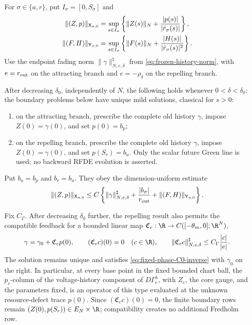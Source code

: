 \begin{proposition}
For \(\sigma\in\{a,r\}\), put \(I_\sigma=[0,S_\sigma]\) and
\begin{align}
 \|(Z,p)\|_{\mathsf X_{\sigma,0}}
 &=\sup_{s\in I_\sigma}
   \left\{\|Z(s)\|_N+\frac{|p(s)|}{|\bar r_\sigma(s)|}\right\},\notag\\
 \|(F,H)\|_{\mathsf Y_{\sigma,0}}
 &=\sup_{s\in I_\sigma}
   \left\{\|F(s)\|_N+\frac{|H(s)|}{|\bar r_\sigma(s)|^2}\right\}. \label{eq:fixed-phase-C0-spaces}
\end{align}
Use the endpoint fading norm
\(\|\gamma\|_{N,e,\delta}^{\sharp}\) from
\cref{eq:frozen-history-norm}, with \(e=r_{\rm out}\) on the attracting
branch and \(e=-\rho_\delta\) on the repelling branch.

After decreasing \(\delta_0\), independently of \(N\), the following holds
whenever \(0<\delta<\delta_0\): the boundary problems below have unique mild
solutions, classical for \(s>0\):
\begin{enumerate}[label=\textup{(\alph*)},leftmargin=2em]
\item on the attracting branch, prescribe the complete old history
\(\gamma\), impose \(Z(0)=\gamma(0)\), and set \(p(0)=b_p\);
\item on the repelling branch, prescribe the complete old history
\(\gamma\), impose \(Z(0)=\gamma(0)\), and set \(p(S_r)=b_u\).
Only the scalar future Green line is used;
no backward RFDE evolution is asserted.
\end{enumerate}
Put \(b_a=b_p\) and \(b_r=b_u\).  They obey the dimension-uniform estimate
\begin{equation}
 \|(Z,p)\|_{\mathsf X_{\sigma,0}}
 \le C\left\{
   \|\gamma\|_{N,e,\delta}^{\sharp}
   +\frac{|b_\sigma|}{r_{\rm out}}
   +\|(F,H)\|_{\mathsf Y_{\sigma,0}}\right\}.     \label{eq:fixed-phase-C0-inverse}
\end{equation}

Fix \(C_\Gamma\).  After decreasing \(\delta_0\) further, the repelling
result also permits the compatible feedback for a bounded linear map
\(\mathfrak C_e:\R\to C([ -\theta_m,0];\R^N)\),
\begin{equation}
 \gamma=\gamma_0+\mathfrak C_ep(0),\qquad
 (\mathfrak C_ec)(0)=0\quad(c\in\R),\qquad
 \|\mathfrak C_ec\|_{N,e,\delta}^{\sharp}
       \le C_\Gamma\frac{|c|}{|e|}.               \label{eq:fixed-phase-collar-feedback}
\end{equation}
The solution remains unique and satisfies
\cref{eq:fixed-phase-C0-inverse} with \(\gamma_0\) on the right.  In
particular, at every base point in the fixed bounded chart ball, the
\(p_e\)-column of the voltage-history component of \(D\Gamma_e^h\), with
\(Z_e\), the core gauge, and the parameters fixed, is an operator of this
type evaluated at the unknown resource-defect trace \(p(0)\).  Since
\((\mathfrak C_ec)(0)=0\), the finite boundary rows remain
\((Z(0),p(S_r))\in E_N\times\R\); compatibility creates no additional
Fredholm row.


\end{proposition}
